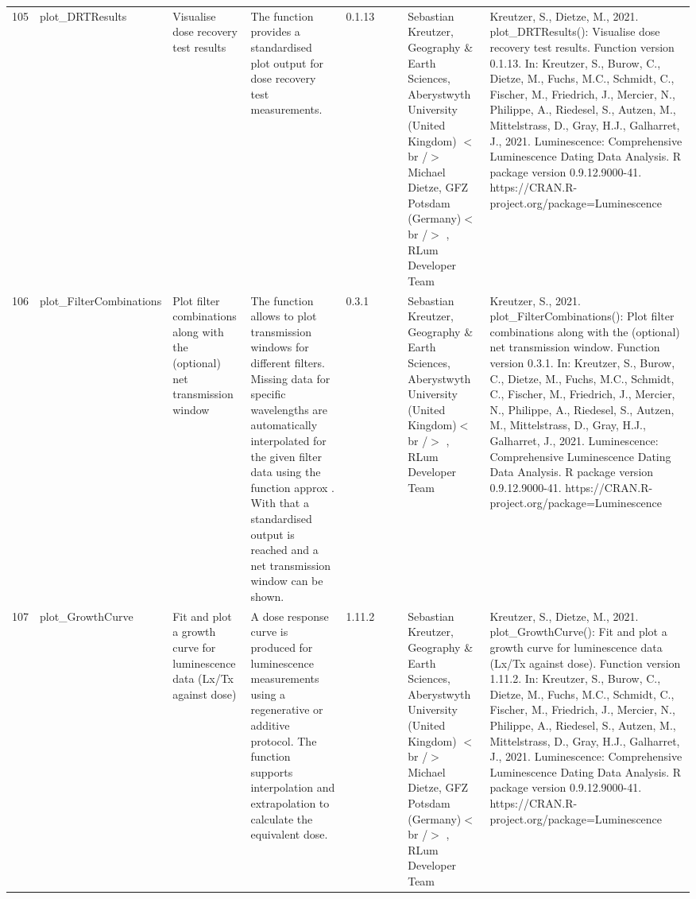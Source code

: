 \begin{table}[ht]
\begin{tabular}{rllllllll}
 \\ 
  105 & plot\_DRTResults & Visualise dose recovery test results & The function provides a standardised plot output for dose recovery test measurements. & 0.1.13
 &  &  & Sebastian Kreutzer, Geography \& Earth Sciences, Aberystwyth University (United Kingdom) $<$br /$>$ Michael Dietze, GFZ Potsdam (Germany)$<$br /$>$ , RLum Developer Team & Kreutzer, S., Dietze, M., 2021. plot\_DRTResults(): Visualise dose recovery test results. Function version 0.1.13. In: Kreutzer, S., Burow, C., Dietze, M., Fuchs, M.C., Schmidt, C., Fischer, M., Friedrich, J., Mercier, N., Philippe, A., Riedesel, S., Autzen, M., Mittelstrass, D., Gray, H.J., Galharret, J., 2021. Luminescence: Comprehensive Luminescence Dating Data Analysis. R package version 0.9.12.9000-41. https://CRAN.R-project.org/package=Luminescence
 \\ 
  106 & plot\_FilterCombinations & Plot filter combinations along with the (optional) net transmission window & The function allows to plot transmission windows for different filters. Missing data for specific wavelengths are automatically interpolated for the given filter data using the function  approx . With that a standardised output is reached and a net transmission window can be shown. & 0.3.1
 &  &  & Sebastian Kreutzer, Geography \& Earth Sciences, Aberystwyth University (United Kingdom)$<$br /$>$ , RLum Developer Team & Kreutzer, S., 2021. plot\_FilterCombinations(): Plot filter combinations along with the (optional) net transmission window. Function version 0.3.1. In: Kreutzer, S., Burow, C., Dietze, M., Fuchs, M.C., Schmidt, C., Fischer, M., Friedrich, J., Mercier, N., Philippe, A., Riedesel, S., Autzen, M., Mittelstrass, D., Gray, H.J., Galharret, J., 2021. Luminescence: Comprehensive Luminescence Dating Data Analysis. R package version 0.9.12.9000-41. https://CRAN.R-project.org/package=Luminescence
 \\ 
  107 & plot\_GrowthCurve & Fit and plot a growth curve for luminescence data (Lx/Tx against dose) & A dose response curve is produced for luminescence measurements using a regenerative or additive protocol. The function supports interpolation and extrapolation to calculate the equivalent dose. & 1.11.2
 &  &  & Sebastian Kreutzer, Geography \& Earth Sciences, Aberystwyth University (United Kingdom) $<$br /$>$ Michael Dietze, GFZ Potsdam (Germany)$<$br /$>$ , RLum Developer Team & Kreutzer, S., Dietze, M., 2021. plot\_GrowthCurve(): Fit and plot a growth curve for luminescence data (Lx/Tx against dose). Function version 1.11.2. In: Kreutzer, S., Burow, C., Dietze, M., Fuchs, M.C., Schmidt, C., Fischer, M., Friedrich, J., Mercier, N., Philippe, A., Riedesel, S., Autzen, M., Mittelstrass, D., Gray, H.J., Galharret, J., 2021. Luminescence: Comprehensive Luminescence Dating Data Analysis. R package version 0.9.12.9000-41. https://CRAN.R-project.org/package=Luminescence

\end{tabular}
\end{table}
